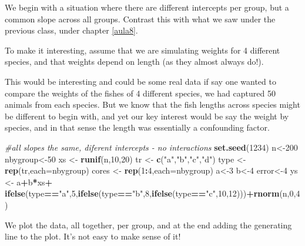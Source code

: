 \documentclass[
]{book}
\newenvironment{Shaded}{\begin{snugshade}}{\end{snugshade}}
\newcommand{\CommentTok}[1]{\textcolor[rgb]{0.56,0.35,0.01}{\textit{#1}}}
\newcommand{\DataTypeTok}[1]{\textcolor[rgb]{0.13,0.29,0.53}{#1}}
\newcommand{\DecValTok}[1]{\textcolor[rgb]{0.00,0.00,0.81}{#1}}
\newcommand{\KeywordTok}[1]{\textcolor[rgb]{0.13,0.29,0.53}{\textbf{#1}}}
\newcommand{\NormalTok}[1]{#1}
\newcommand{\OperatorTok}[1]{\textcolor[rgb]{0.81,0.36,0.00}{\textbf{#1}}}
\newcommand{\StringTok}[1]{\textcolor[rgb]{0.31,0.60,0.02}{#1}}
\begin{document}
We begin with a situation where there are different intercepts per group, but a common slope across all groups. Contrast this with what we saw under the previous class, under chapter \ref{aula8}.

To make it interesting, assume that we are simulating weights for 4 different species, and that weights depend on length (as they almost always do!).

This would be interesting and could be some real data if say one wanted to compare the weights of the fishes of 4 different species, we had captured 50 animals from each species. But we know that the fish lengths across species might be different to begin with, and yet our key interest would be say the weight by species, and in that sense the length was essentially a confounding factor.

\begin{Shaded}
\begin{Highlighting}[]
\CommentTok{#all slopes the same, diferent intercepts - no interactions}
\KeywordTok{set.seed}\NormalTok{(}\DecValTok{1234}\NormalTok{)}
\NormalTok{n<-}\DecValTok{200}
\NormalTok{nbygroup<-}\DecValTok{50}
\NormalTok{xs <-}\StringTok{ }\KeywordTok{runif}\NormalTok{(n,}\DecValTok{10}\NormalTok{,}\DecValTok{20}\NormalTok{)}
\NormalTok{tr <-}\StringTok{ }\KeywordTok{c}\NormalTok{(}\StringTok{"a"}\NormalTok{,}\StringTok{"b"}\NormalTok{,}\StringTok{"c"}\NormalTok{,}\StringTok{"d"}\NormalTok{)}
\NormalTok{type <-}\StringTok{ }\KeywordTok{rep}\NormalTok{(tr,}\DataTypeTok{each=}\NormalTok{nbygroup)}
\NormalTok{cores <-}\StringTok{ }\KeywordTok{rep}\NormalTok{(}\DecValTok{1}\OperatorTok{:}\DecValTok{4}\NormalTok{,}\DataTypeTok{each=}\NormalTok{nbygroup)}
\NormalTok{a<-}\DecValTok{3}
\NormalTok{b<-}\DecValTok{4}
\NormalTok{error<-}\DecValTok{4}
\NormalTok{ys <-}\StringTok{ }\NormalTok{a}\OperatorTok{+}\NormalTok{b}\OperatorTok{*}\NormalTok{xs}\OperatorTok{+}
\KeywordTok{ifelse}\NormalTok{(type}\OperatorTok{==}\StringTok{"a"}\NormalTok{,}\DecValTok{5}\NormalTok{,}\KeywordTok{ifelse}\NormalTok{(type}\OperatorTok{==}\StringTok{"b"}\NormalTok{,}\DecValTok{8}\NormalTok{,}\KeywordTok{ifelse}\NormalTok{(type}\OperatorTok{==}\StringTok{"c"}\NormalTok{,}\DecValTok{10}\NormalTok{,}\DecValTok{12}\NormalTok{)))}\OperatorTok{+}\KeywordTok{rnorm}\NormalTok{(n,}\DecValTok{0}\NormalTok{,}\DecValTok{4}\NormalTok{)}
\end{Highlighting}
\end{Shaded}

We plot the data, all together, per group, and at the end adding the generating line to the plot. It's not easy to make sense of it!
\end{document}
